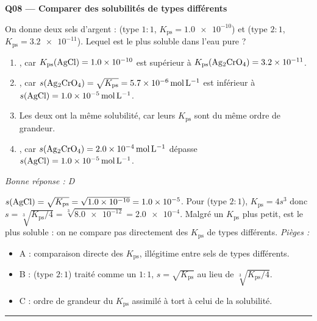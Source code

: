 \documentclass[11pt,a4paper]{article}
\begin{document}
\noindent\textbf{Q08 --- Comparer des solubilités de types différents}\par
On donne deux sels d'argent :  (type $1{:}1$, $K_{\mathrm{ps}} = \num{1.0e-10}$) et 
(type $2{:}1$, $K_{\mathrm{ps}} = \num{3.2e-11}$). Lequel est le plus soluble dans l'eau pure ?
\begin{enumerate}[label=\Alph*)]
\item {}, car $K_{\mathrm{ps}}(\ce{AgCl}) = \num{1.0e-10}$ est supérieur à $K_{\mathrm{ps}}(\ce{Ag2CrO4}) = \num{3.2e-11}$.
\item {}, car $s(\ce{Ag2CrO4}) = \sqrt{K_{\mathrm{ps}}} = \qty{5.7e-6}{\mole\per\litre}$ est inférieur à $s(\ce{AgCl}) = \qty{1.0e-5}{\mole\per\litre}$.
\item Les deux ont la même solubilité, car leurs $K_{\mathrm{ps}}$ sont du même ordre de grandeur.
\item {}, car $s(\ce{Ag2CrO4}) = \qty{2.0e-4}{\mole\per\litre}$ dépasse $s(\ce{AgCl}) = \qty{1.0e-5}{\mole\per\litre}$.
\end{enumerate}
\textit{Bonne réponse : D}\par
$s(\ce{AgCl}) = \sqrt{K_{\mathrm{ps}}} = \sqrt{\num{1.0e-10}} = \num{1.0e-5}$. Pour  (type $2{:}1$),
$K_{\mathrm{ps}} = 4s^{3}$ donc $s = \sqrt[3]{K_{\mathrm{ps}}/4} = \sqrt[3]{\num{8.0e-12}} = \num{2.0e-4}$. Malgré un
$K_{\mathrm{ps}}$ plus petit,  est le plus soluble : on ne compare pas directement des $K_{\mathrm{ps}}$ de types différents.
\textit{Pièges :}
\begin{itemize}
\item A : comparaison directe des $K_{\mathrm{ps}}$, illégitime entre sels de types différents.
\item B :  (type $2{:}1$) traité comme un $1{:}1$, $s = \sqrt{K_{\mathrm{ps}}}$ au lieu de $\sqrt[3]{K_{\mathrm{ps}}/4}$.
\item C : ordre de grandeur du $K_{\mathrm{ps}}$ assimilé à tort à celui de la solubilité.
\end{itemize}
\vspace{6pt}\hrule\vspace{8pt}
\end{document}
